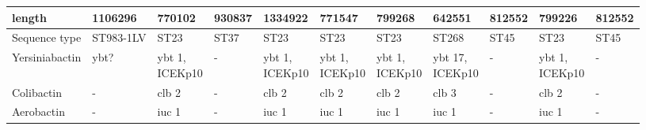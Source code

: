 \begin{table}
\begin{threeparttable}
\begin{tabular}{lllllllllll}
{                length} &         1106296 &                           770102 &        930837 &          1334922 &                771547 &                799268 &                           642551 &           812552 &                           799226 &           812552 \\
\midrule
          Sequence type &       ST983-1LV &                             ST23 &          ST37 &             ST23 &                  ST23 &                  ST23 &                            ST268 &             ST45 &                             ST23 &             ST45 \\
         Yersiniabactin &            ybt? &                   \mCL{ybt 1, \\
                                                                    ICEKp10} &             - &   \mCL{ybt 1, \\
                                                                                                       ICEKp10} &        \mCL{ybt 1, \\
                                                                                                                               ICEKp10} &        \mCL{ybt 1, \\
                                                                                                                                                       ICEKp10} &                  \mCL{ybt 17, \\
                                                                                                                                                                                          ICEKp10} &                - &                   \mCL{ybt 1, \\
                                                                                                                                                                                                                                                ICEKp10} &                - \\
             Colibactin &               - &                            clb 2 &             - &            clb 2 &                 clb 2 &                 clb 2 &                            clb 3 &                - &                            clb 2 &                - \\
             Aerobactin &               - &                            iuc 1 &             - &            iuc 1 &                 iuc 1 &                 iuc 1 &                            iuc 1 &                - &                            iuc 1 &                - \\

\end{tabular}
\end{threeparttable}
\end{table}
